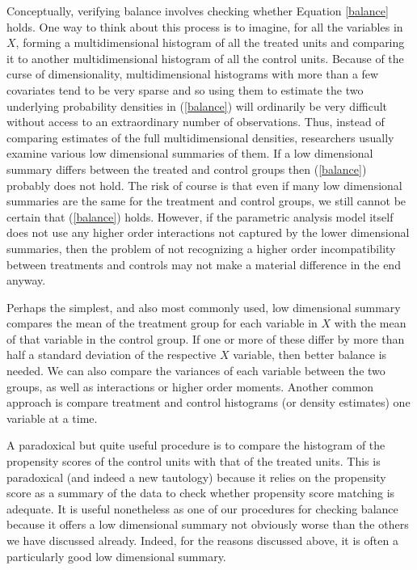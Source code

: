 \documentclass[11pt,titlepage]{article}
\begin{document}
Conceptually, verifying balance involves checking whether Equation
\ref{balance} holds.  One way to think about this process is to
imagine, for all the variables in $X$, forming a multidimensional
histogram of all the treated units and comparing it to another
multidimensional histogram of all the control units.  Because of the
curse of dimensionality, multidimensional histograms with more than a
few covariates tend to be very sparse and so using them to estimate
the two underlying probability densities in (\ref{balance}) will
ordinarily be very difficult without access to an extraordinary number
of observations.  Thus, instead of comparing estimates of the full
multidimensional densities, researchers usually examine various low
dimensional summaries of them.  If a low dimensional summary differs
between the treated and control groups then (\ref{balance}) probably
does not hold.  The risk of course is that even if many low
dimensional summaries are the same for the treatment and control
groups, we still cannot be certain that (\ref{balance}) holds.
However, if the parametric analysis model itself does not use any
higher order interactions not captured by the lower dimensional
summaries, then the problem of not recognizing a higher order
incompatibility between treatments and controls may not make a
material difference in the end anyway.

Perhaps the simplest, and also most commonly used, low dimensional
summary compares the mean of the treatment group for each variable in
$X$ with the mean of that variable in the control group.  If one or
more of these differ by more than half a standard deviation of the
respective $X$ variable, then better balance is needed.  We can also
compare the variances of each variable between the two groups, as well
as interactions or higher order moments.  Another common approach is
compare treatment and control histograms (or density estimates) one
variable at a time.

A paradoxical but quite useful procedure is to compare the histogram
of the propensity scores of the control units with that of the treated
units. This is paradoxical (and indeed a new tautology) because it
relies on the propensity score as a summary of the data to check
whether propensity score matching is adequate.  It is useful
nonetheless as one of our procedures for checking balance because it
offers a low dimensional summary not obviously worse than the others
we have discussed already.  Indeed, for the reasons discussed above,
it is often a particularly good low dimensional summary.
\end{document}
